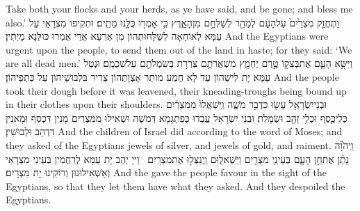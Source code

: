 {Take both your flocks and your herds, as ye have said, and be gone; and bless me also.’}{}
{וַתֶּחֱזַ֤ק מִצְרַ֙יִם֙ עַל\maqqaf הָעָ֔ם לְמַהֵ֖ר לְשַׁלְּחָ֣ם מִן\maqqaf הָאָ֑רֶץ כִּ֥י אָמְר֖וּ כֻּלָּ֥נוּ מֵתִֽים׃}
{וּתְקִיפוּ מִצְרָאֵי עַל עַמָּא לְאוֹחָאָה לְשַׁלָּחוּתְהוֹן מִן אַרְעָא אֲרֵי אֲמַרוּ כּוּלַּנָא מָיְתִין׃}
{And the Egyptians were urgent upon the people, to send them out of the land in haste; for they said: ‘We are all dead men.’}{}
{וַיִּשָּׂ֥א הָעָ֛ם אֶת\maqqaf בְּצֵק֖וֹ טֶ֣רֶם יֶחְמָ֑ץ מִשְׁאֲרֹתָ֛ם צְרֻרֹ֥ת בְּשִׂמְלֹתָ֖ם עַל\maqqaf שִׁכְמָֽם׃}
{וּנְטַל עַמָּא יָת לֵישְׁהוֹן עַד לָא חֲמַע מוֹתַר אָצְוָתְהוֹן צְרִיר בִּלְבוּשֵׁיהוֹן עַל כַּתְפֵיהוֹן׃}
{And the people took their dough before it was leavened, their kneading-troughs being bound up in their clothes upon their shoulders.}{}
{וּבְנֵי\maqqaf יִשְׂרָאֵ֥ל עָשׂ֖וּ כִּדְבַ֣ר מֹשֶׁ֑ה וַֽיִּשְׁאֲלוּ֙ מִמִּצְרַ֔יִם כְּלֵי\maqqaf כֶ֛סֶף וּכְלֵ֥י זָהָ֖ב וּשְׂמָלֹֽת׃}
{וּבְנֵי יִשְׂרָאֵל עֲבַדוּ כְּפִתְגָמָא דְּמֹשֶׁה וּשְׁאִילוּ מִמִּצְרַיִם מָנִין דִּכְסַף וּמָאנִין דִּדְהַב וּלְבוּשִׁין׃}
{And the children of Israel did according to the word of Moses; and they asked of the Egyptians jewels of silver, and jewels of gold, and raiment.}{}
{וַֽיהֹוָ֞ה נָתַ֨ן אֶת\maqqaf חֵ֥ן הָעָ֛ם בְּעֵינֵ֥י מִצְרַ֖יִם וַיַּשְׁאִל֑וּם וַֽיְנַצְּל֖וּ אֶת\maqqaf מִצְרָֽיִם׃ \petucha }
{וַייָ יְהַב יָת עַמָּא לְרַחֲמִין בְּעֵינֵי מִצְרָאֵי וְאַשְׁאִילוּנוּן וְרוֹקִינוּ יָת מִצְרָיִם׃}
{And the \lord\space gave the people favour in the sight of the Egyptians, so that they let them have what they asked. And they despoiled the Egyptians.}{}
